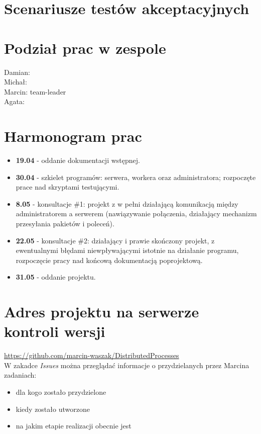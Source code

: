 \documentclass[paper=a4, fontsize=11pt]{scrartcl} %
\begin{document}
\section*{Scenariusze testów akceptacyjnych}
\section*{Podział prac w zespole}
Damian: \\
Michał: \\
Marcin: team-leader \\
Agata: \\

\section*{Harmonogram prac}
\begin{itemize}
\item \textbf{19.04} - oddanie dokumentacji wstępnej. 
\item \textbf{30.04} - szkielet programów: serwera, workera oraz administratora;  rozpoczęte prace nad skryptami testującymi. 
\item \textbf{8.05} - konsultacje \#1: projekt z w pełni działającą komunikacją między administratorem a serwerem (nawiązywanie połączenia, działający mechanizm przesyłania pakietów i poleceń). 
\item \textbf{22.05} - konsultacje \#2: działający i prawie skończony projekt, z ewentualnymi błędami niewpływającymi istotnie na działanie programu, rozpoczęcie pracy nad końcową dokumentacją poprojektową. 
\item \textbf{31.05} - oddanie projektu.
\end{itemize}

\section*{Adres projektu na serwerze kontroli wersji}
\url{https://github.com/marcin-waszak/DistributedProcesses}  \\

W zakadce \textit{Issues} można przeglądać informacje o przydzielanych przez Marcina zadaniach: 
\begin{itemize}
\item dla kogo zostało przydzielone
\item kiedy zostało utworzone
\item na jakim etapie realizacji obecnie jest
\end{itemize}
\end{document}
